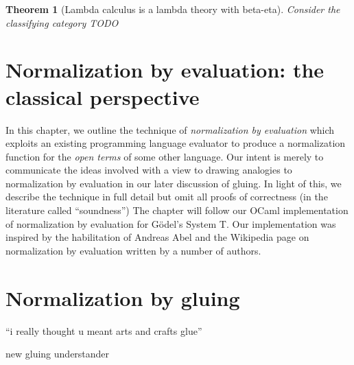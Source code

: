 \documentclass[12pt,twoside]{reedthesis}
\theoremstyle{definition}
\theoremstyle{remark}
\theoremstyle{plain}
\newtheorem{theorem}{Theorem}
\begin{document}
\begin{theorem}[Lambda calculus is a lambda theory with beta-eta]
  Consider the classifying category TODO
\end{theorem}

\chapter{Normalization by evaluation: the classical perspective}
In this chapter, we outline the technique of \emph{normalization by evaluation}
which exploits an existing programming language evaluator to produce a
normalization function for the \emph{open terms} of some other language. Our
intent is merely to communicate the ideas involved with a view to drawing
analogies to normalization by evaluation in our later discussion of gluing. In
light of this, we describe the technique in full detail but omit all proofs of
correctness (in the literature called ``soundness'') %
The chapter will follow our OCaml implementation of normalization by evaluation
for G\"odel's System T. Our implementation was inspired by the habilitation of
Andreas Abel and the Wikipedia page on normalization by evaluation written by a
number of authors.

\chapter{Normalization by gluing}
\epigraph{``i really thought u meant arts and crafts glue''}{new gluing understander}
\newcommand{\red}{\rightarrow^{*}} %
\end{document}

